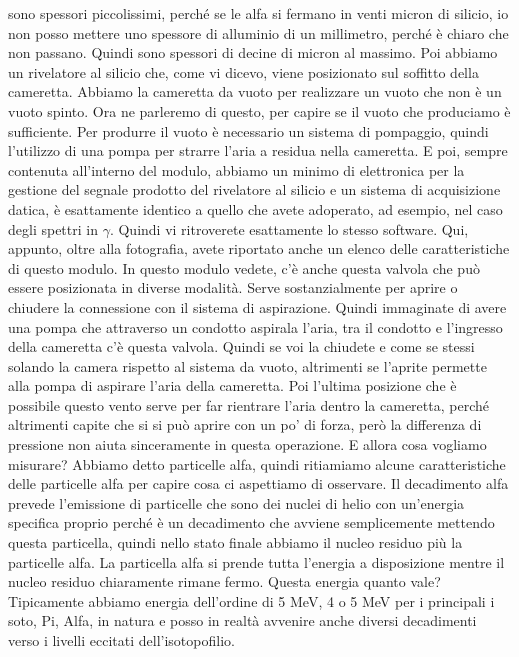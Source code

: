 {sono spessori piccolissimi, perché se le alfa si fermano in venti micron di silicio, io non posso mettere uno spessore di alluminio di un millimetro, perché è chiaro che non passano. Quindi sono spessori di decine di micron al massimo. Poi abbiamo un rivelatore al silicio che, come vi dicevo, viene posizionato sul soffitto della cameretta. Abbiamo la cameretta da vuoto per realizzare un vuoto che non è un vuoto spinto. Ora ne parleremo di questo, per capire se il vuoto che produciamo è sufficiente. Per produrre il vuoto è necessario un sistema di pompaggio, quindi l'utilizzo di una pompa per strarre l'aria a residua nella cameretta. E poi, sempre contenuta all'interno del modulo, abbiamo un minimo di elettronica per la gestione del segnale prodotto del rivelatore al silicio e un sistema di acquisizione datica, è esattamente identico a quello che avete adoperato, ad esempio, nel caso degli spettri in $\gamma$. Quindi vi ritroverete esattamente lo stesso software. Qui, appunto, oltre alla fotografia, avete riportato anche un elenco delle caratteristiche di questo modulo. In questo modulo vedete, c'è anche questa valvola che può essere posizionata in diverse modalità. Serve sostanzialmente per aprire o chiudere la connessione con il sistema di aspirazione. Quindi immaginate di avere una pompa che attraverso un condotto aspirala l'aria, tra il condotto e l'ingresso della cameretta c'è questa valvola. Quindi se voi la chiudete e come se stessi solando la camera rispetto al sistema da vuoto, altrimenti se l'aprite permette alla pompa di aspirare l'aria della cameretta. Poi l'ultima posizione che è possibile questo vento serve per far rientrare l'aria dentro la cameretta, perché altrimenti capite che si si può aprire con un po' di forza, però la differenza di pressione non aiuta sinceramente in questa operazione. E allora cosa vogliamo misurare? Abbiamo detto particelle alfa, quindi ritiamiamo alcune caratteristiche delle particelle alfa per capire cosa ci aspettiamo di osservare. Il decadimento alfa prevede l'emissione di particelle che sono dei nuclei di helio con un'energia specifica proprio perché è un decadimento che avviene semplicemente mettendo questa particella, quindi nello stato finale abbiamo il nucleo residuo più la particelle alfa. La particella alfa si prende tutta l'energia a disposizione mentre il nucleo residuo chiaramente rimane fermo. Questa energia quanto vale? Tipicamente abbiamo energia dell'ordine di 5 MeV, 4 o 5 MeV per i principali i soto, Pi, Alfa, in natura e posso in realtà avvenire anche diversi decadimenti verso i livelli eccitati dell'isotopofilio. 

}
